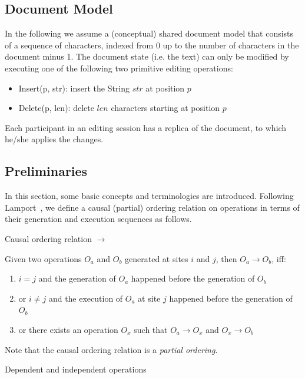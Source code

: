 \subsection{Document Model}
In the following we assume a (conceptual) shared document model that consists 
of a sequence of characters, indexed from 0 up to the number of characters in
the document minus 1. The document state (i.e. the text) can only be 
modified by executing one of the following two primitive editing operations:

\begin{itemize}
 \item Insert(p, str): insert the String $str$ at position $p$
 \item Delete(p, len): delete $len$ characters starting at position $p$
\end{itemize}

Each participant in an editing session has a replica of the document, to which
he/she applies the changes.


\subsection{Preliminaries}
In this section, some basic concepts and terminologies are introduced. Following Lamport~\cite{lamport78}, we define a causal (partial) ordering relation on operations in terms of their generation and execution sequences as follows.

\begin{defn}
Causal ordering relation $\rightarrow$
\end{defn}

Given two operations $O_{a}$ and $O_{b}$ generated at sites $i$ and $j$, then $O_{a}\rightarrow O_{b}$, iff:
\begin{enumerate}
 \item $i=j$ and the generation of $O_{a}$ happened before the generation of 
       $O_{b}$
 \item or $i \neq j$ and the execution of $O_{a}$ at site $j$ happened before 
       the generation of $O_{b}$
 \item or there exists an operation $O_{x}$ such that $O_{a}\rightarrow O_{x}$
       and $O_{x}\rightarrow O_{b}$
\end{enumerate}

Note that the causal ordering relation is a \emph{partial ordering}.

\begin{defn}
Dependent and independent operations
\end{defn}

